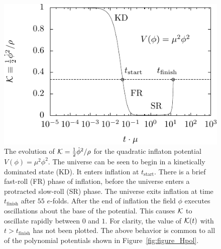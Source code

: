 %
\begin{figure}[tp]
  \includegraphics[width=\textwidth]{chapters/kinetic_dominance/figures/Kpol} 
  \caption{The evolution of \(\mathcal{K} = \frac{1}{2}\dot{\phi}^2/\rho\) for the quadratic inflaton potential \(V(\phi) = \mu^2 \phi^2\).  The universe can be seen to begin in a kinetically dominated state (KD).  It enters inflation at \(t_\mathrm{start}\). There is a brief fast-roll (FR) phase of inflation, before the universe enters a protracted slow-roll (SR) phase. The universe exits inflation at time \(t_\mathrm{finish}\) after \(55\) \(e\)-folds. After the end of inflation the field \(\phi\) executes oscillations about the base of the potential. This causes \(\mathcal{K}\) to oscillate rapidly between \(0\) and \(1\). For clarity, the value of \(\mathcal{K}(t)\) with \(t>t_\mathrm{finish}\) has not been plotted. The above behavior is common to all of the  polynomial potentials shown in Figure~\protect\ref{fig:figure_Hpol}.\label{fig:figure_Kpol}  }
\end{figure}
%

